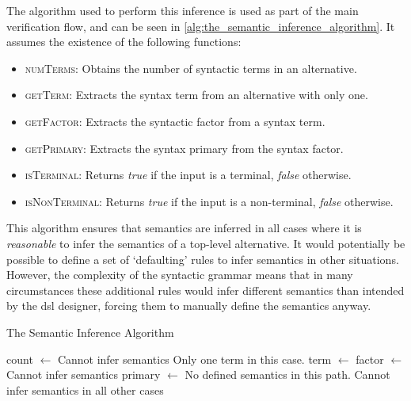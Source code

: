 The algorithm used to perform this inference is used as part of the main verification flow, and can be seen in \autoref{alg:the_semantic_inference_algorithm}.
It assumes the existence of the following functions:
\begin{itemize}
    \item \textsc{numTerms}: Obtains the number of syntactic terms in an alternative. 
    \item \textsc{getTerm}: Extracts the syntax term from an alternative with only one.
    \item \textsc{getFactor}: Extracts the syntactic factor from a syntax term.
    \item \textsc{getPrimary}: Extracts the syntax primary from the syntax factor.
    \item \textsc{isTerminal}: Returns \textit{true} if the input is a terminal, \textit{false} otherwise.
    \item \textsc{isNonTerminal}: Returns \textit{true} if the input is a non-terminal, \textit{false} otherwise.
\end{itemize}

This algorithm ensures that semantics are inferred in all cases where it is \textit{reasonable} to infer the semantics of a top-level alternative.
It would potentially be possible to define a set of `defaulting' rules to infer semantics in other situations.
However, the complexity of the syntactic grammar means that in many circumstances these additional rules would infer different semantics than intended by the \gls{dsl} designer, forcing them to manually define the semantics anyway. 

\begin{algorithm}[!htb]
\caption{The Semantic Inference Algorithm}
\label{alg:the_semantic_inference_algorithm}
\begin{algorithmic}
    \State count $\gets$ 
        \State {} 
        \Comment Cannot infer semantics
    \Else
        \Comment Only one term in this case.
        \State term $\gets$ 
        \State factor $\gets$ 
        \State {}
    \EndIf
\EndFunction
\State
{}
        \State {} 
        \Comment Cannot infer semantics
    \Else
        \State primary $\gets$ 
        \State {}
    \EndIf
\EndFunction
\State
{}
        \State {}
        \Comment No defined semantics in this path.
        \State {}
    \Else
        \State {} 
        \Comment Cannot infer semantics in all other cases
    \EndIf
\EndFunction
\end{algorithmic}
\end{algorithm}

